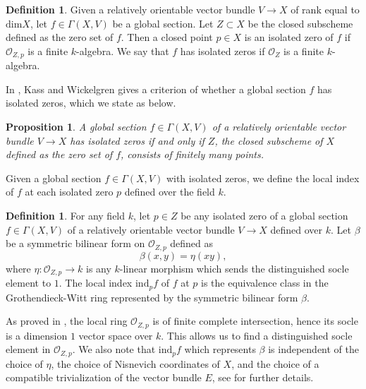 \documentclass[12pt, reqno]{amsart}
\newtheorem{proposition}[theorem]{Proposition}
\theoremstyle{definition}
\newtheorem{definition}[theorem]{Definition}
\newcommand{\Oh}{\mathscr{O}} %
\newcommand{\ind}{\mathrm{ind}} %
\begin{document}
\begin{definition} \cite[Definition 22]{kwcubic}
Given a relatively orientable vector bundle $V \to X$ of rank equal to $\text{dim}X$, let $f \in \Gamma(X, V)$ be a global section. Let $Z \subset X$ be the closed subscheme defined as the zero set of $f$. Then a closed point $p \in X$ is an isolated zero of $f$ if $\Oh_{Z,p}$ is a finite $k$-algebra. We say that $f$ has isolated zeros if $\Oh_Z$ is a finite $k$-algebra.
\end{definition}

In \cite[Proposition 23]{kwcubic}, Kass and Wickelgren gives a criterion of whether a global section $f$ has isolated zeros, which we state as below.

\begin{proposition} \label{isozero} \cite[Proposition 23]{kwcubic}
A global section $f \in \Gamma(X,V)$ of a relatively orientable vector bundle $V \to X$ has isolated zeros if and only if $Z$, the closed subscheme of $X$ defined as the zero set of $f$, consists of finitely many points.
\end{proposition}

Given a global section $f \in \Gamma(X,V)$ with isolated zeros, we define the local index of $f$ at each isolated zero $p$ defined over the field $k$.
\begin{definition} \cite[Definition 30]{kwcubic} \label{def:localind}
    For any field $k$, let $p \in Z$ be any isolated zero of a global section $f \in \Gamma(X, V)$ of a relatively orientable vector bundle $V \to X$ defined over $k$. Let $\beta$ be a symmetric bilinear form on $\Oh_{Z,p}$ defined as
    \begin{equation*}
        \beta(x,y) = \eta(xy),
    \end{equation*}
    where $\eta: \Oh_{Z,p} \to k$ is any $k$-linear morphism which sends the distinguished socle element to $1$. The local index $\ind_p f$ of $f$ at $p$ is the equivalence class in the Grothendieck-Witt ring represented by the symmetric bilinear form $\beta$.
\end{definition}

As proved in \cite[Section 4]{kwcubic}, the local ring $\Oh_{Z,p}$ is of finite complete intersection, hence its socle is a dimension $1$ vector space over $k$. This allows us to find a distinguished socle element in $\Oh_{Z,p}$. We also note that $\ind_p f$ which represents $\beta$ is independent of the choice of $\eta$, the choice of Nisnevich coordinates of $X$, and the choice of a compatible trivialization of the vector bundle $E$, see \cite[Corollary 31]{kwcubic} for further details.
\end{document}
